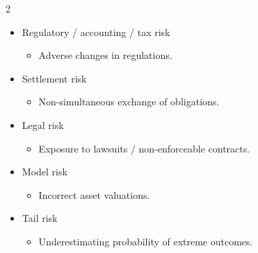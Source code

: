 \documentclass[../notes_compiled.tex]{subfiles}
\begin{document}
\begin{itemize}
\begin{multicols}{2}
\begin{itemize}
\item Regulatory / accounting / tax risk
\begin{itemize}
\item Adverse changes in regulations.
\end{itemize}
\item Settlement risk
\begin{itemize}
\item Non-simultaneous exchange of obligations.
\end{itemize}
\item Legal risk
\begin{itemize}
\item Exposure to lawsuits / non-enforceable contracts.
\end{itemize}
\item Model risk
\begin{itemize}
\item Incorrect asset valuations.
\end{itemize}
\item Tail risk
\begin{itemize}
\item Underestimating probability of extreme outcomes.
\end{itemize}
\end{itemize}
\end{multicols}
\end{itemize}
\end{document}

